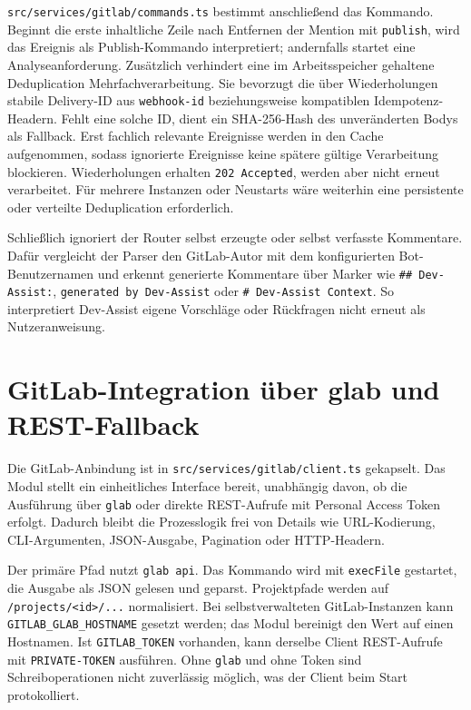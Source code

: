 \documentclass[12pt,a4paper,oneside]{scrreprt}
\begin{document}
\texttt{src/services/gitlab/commands.ts} bestimmt anschließend das Kommando. Beginnt die erste inhaltliche Zeile nach Entfernen der Mention mit \texttt{publish}, wird das Ereignis als Publish-Kommando interpretiert; andernfalls startet eine Analyseanforderung. Zusätzlich verhindert eine im Arbeitsspeicher gehaltene Deduplication Mehrfachverarbeitung. Sie bevorzugt die über Wiederholungen stabile Delivery-ID aus \texttt{webhook-id} beziehungsweise kompatiblen Idempotenz-Headern. Fehlt eine solche ID, dient ein SHA-256-Hash des unveränderten Bodys als Fallback. Erst fachlich relevante Ereignisse werden in den Cache aufgenommen, sodass ignorierte Ereignisse keine spätere gültige Verarbeitung blockieren. Wiederholungen erhalten \texttt{202 Accepted}, werden aber nicht erneut verarbeitet. Für mehrere Instanzen oder Neustarts wäre weiterhin eine persistente oder verteilte Deduplication erforderlich.

Schließlich ignoriert der Router selbst erzeugte oder selbst verfasste Kommentare. Dafür vergleicht der Parser den GitLab-Autor mit dem konfigurierten Bot-Benutzernamen und erkennt generierte Kommentare über Marker wie \texttt{\#\# Dev-Assist:}, \texttt{generated by Dev-Assist} oder \texttt{\# Dev-Assist Context}. So interpretiert Dev-Assist eigene Vorschläge oder Rückfragen nicht erneut als Nutzeranweisung.

\section{GitLab-Integration über glab und REST-Fallback}

Die GitLab-Anbindung ist in \texttt{src/services/gitlab/client.ts} gekapselt. Das Modul stellt ein einheitliches Interface bereit, unabhängig davon, ob die Ausführung über \texttt{glab} oder direkte REST-Aufrufe mit Personal Access Token erfolgt. Dadurch bleibt die Prozesslogik frei von Details wie URL-Kodierung, CLI-Argumenten, JSON-Ausgabe, Pagination oder HTTP-Headern.

Der primäre Pfad nutzt \texttt{glab api}. Das Kommando wird mit \texttt{execFile} gestartet, die Ausgabe als JSON gelesen und geparst. Projektpfade werden auf \texttt{/projects/\textless{}id\textgreater{}/...} normalisiert. Bei selbstverwalteten GitLab-Instanzen kann \texttt{GITLAB\_GLAB\_HOSTNAME} gesetzt werden; das Modul bereinigt den Wert auf einen Hostnamen. Ist \texttt{GITLAB\_TOKEN} vorhanden, kann derselbe Client REST-Aufrufe mit \texttt{PRIVATE-TOKEN} ausführen. Ohne \texttt{glab} und ohne Token sind Schreiboperationen nicht zuverlässig möglich, was der Client beim Start protokolliert.
\end{document}
